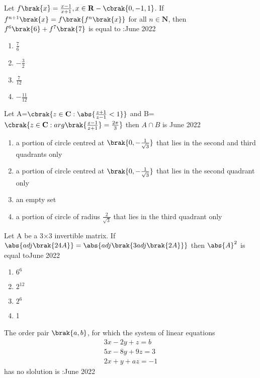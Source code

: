 \iffalse
\title{Assignment}
\author{EE24BTECH11038}
\section{mcq-single}
\fi
\item Let $f\brak{x}=\frac{x-1}{x+1},x\in \mathbf{R}-\cbrak{0,-1,1}$. If $f^{n+1}\brak{x}=f\brak{f^{n}\brak{x}}$ for all $n\in\mathbf{N}$, then $f^6\brak{6}+f^7\brak{7}$ is equal to :\hfill{June 2022}
\begin{enumerate}
    \item $\frac{7}{6}$
    \item $-\frac{3}{2}$
    \item $\frac{7}{12}$
    \item $-\frac{11}{12}$
\end{enumerate}
\bigskip
\item Let A=$\cbrak{z\in \mathbf{C}:\abs{\frac{z+1}{z-1}<1}}$ and B=$\cbrak{z\in \mathbf{C}:arg \brak{\frac{z-1}{z+1}}=\frac{2\pi}{3}}$ then $A\cap B$ is \hfill{June 2022}
\begin{enumerate}
    \item a portion of circle centred at $\brak{0,-\frac{1}{\sqrt{3}}}$ that lies in the second and third quadrants only
    \item a portion of circle centred at $\brak{0,-\frac{1}{\sqrt{3}}}$ that lies in the second quadrant only
    \item an empty set
    \item a portion of circle of radius $\frac{2}{\sqrt{3}}$ that lies in the third quadrant only
\end{enumerate}
\bigskip
\item Let A be a 3$\times$3 invertible matrix. If $\abs{adj\brak{24A}}=\abs{adj\brak{3adj\brak{2A}}}$ then $\abs{A}^2$ is equal to\hfill{June 2022}
\begin{enumerate}
    \item $6^6$
    \item $2^{12}$
    \item $2^6$
    \item 1
\end{enumerate}
\bigskip
\item The order pair $\brak{a,b}$, for which the system of linear equations 
\begin{align*}
    3x-2y+z=b\\
    5x-8y+9z=3\\
    2x+y+az=-1
\end{align*}
has no slolution is :\hfill{June 2022}
